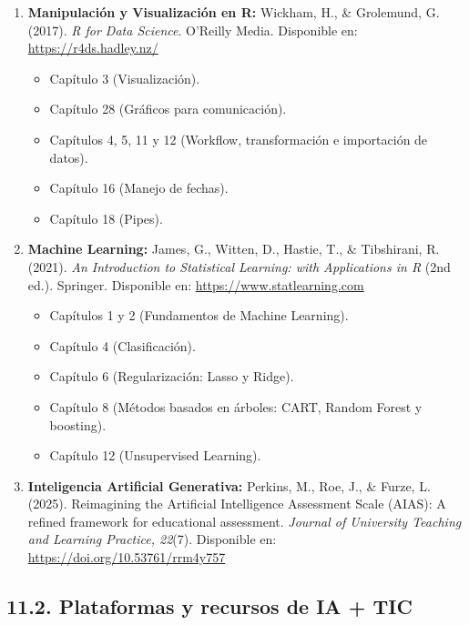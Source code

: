 \documentclass[11pt,a4paper]{article}
\begin{document}
\begin{enumerate}
    \item \textbf{Manipulación y Visualización en R:}  
    Wickham, H., \& Grolemund, G. (2017). \textit{R for Data Science}. O'Reilly Media.  
    Disponible en: \url{https://r4ds.hadley.nz/}
    
    \begin{itemize}
        \item Capítulo 3 (Visualización).
        \item Capítulo 28 (Gráficos para comunicación).
        \item Capítulos 4, 5, 11 y 12 (Workflow, transformación e importación de datos).
        \item Capítulo 16 (Manejo de fechas).
        \item Capítulo 18 (Pipes).
    \end{itemize}
    
    \item \textbf{Machine Learning:}  
    James, G., Witten, D., Hastie, T., \& Tibshirani, R. (2021). \textit{An Introduction to Statistical Learning: with Applications in R} (2nd ed.). Springer.  
    Disponible en: \url{https://www.statlearning.com}
    
    \begin{itemize}
        \item Capítulos 1 y 2 (Fundamentos de Machine Learning).
        \item Capítulo 4 (Clasificación).
        \item Capítulo 6 (Regularización: Lasso y Ridge).
        \item Capítulo 8 (Métodos basados en árboles: CART, Random Forest y boosting).
        \item Capítulo 12 (Unsupervised Learning).
    \end{itemize}

    \item \textbf{Inteligencia Artificial Generativa:}
    Perkins, M., Roe, J., \& Furze, L. (2025). Reimagining the Artificial Intelligence Assessment Scale (AIAS): A refined framework for educational assessment. \textit{Journal of University Teaching and Learning Practice, 22}(7).
    Disponible en: \url{https://doi.org/10.53761/rrm4y757}
\end{enumerate}

\subsection*{11.2. Plataformas y recursos de IA + TIC}
\end{document}

